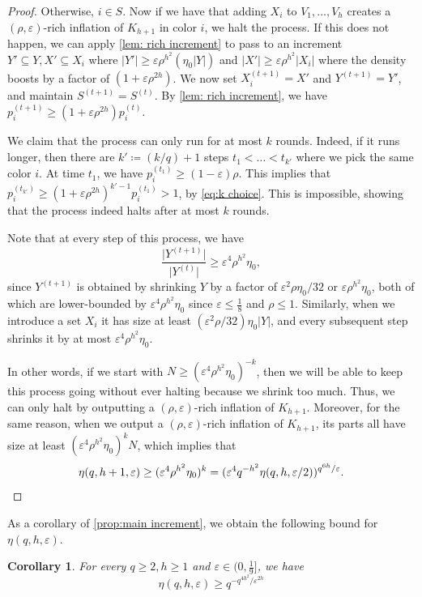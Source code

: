 \documentclass{aic}
\theoremstyle{plain}
\newtheorem{corollary}[theorem]{Corollary}
\theoremstyle{remark}
\newcommand{\eps}{\ensuremath{\varepsilon}}
\newcommand\ab[1]{\lvert #1 \rvert}
\newcommand\up[1]{^{(#1)}}
\begin{document}
\begin{proof}
Otherwise, $i\in S$. Now if we have that adding $X_i$ to $V_1,\dots,V_{h}$ creates a $(\rho,\eps)$-rich inflation of $K_{h+1}$ in color $i$, we halt the process. If this does not happen, we can apply \cref{lem: rich increment} to pass to an increment $Y'\subseteq Y,X'\subseteq X_i$ where $|Y'|\ge \eps \rho^{h^2}(\eta_0 \ab{Y})$ and $|X'|\ge \eps \rho^{h^2}|X_i|$ where the density boosts by a factor of $(1+\eps\rho^{2h})$. We now set $X_i \up{t+1}=X'$ and $Y\up{t+1} = Y'$, and maintain $S\up{t+1}=S\up t$. By \cref{lem: rich increment}, we have $p_i\up{t+1} \geq (1+\eps \rho^{2h})p_i\up t$.

We claim that the process can only run for at most $k$ rounds. Indeed, if it runs longer, then there are $k'\coloneqq (k/q)+1$ steps $t_1<\dots <t_{k'}$ where we pick the same color $i$. At time $t_1$, we have $p_i\up{t_1}\ge (1-\eps)\rho$. This implies that $p_i\up {t_{k'}} \ge (1+\eps\rho^{2h})^{k'-1}p_i\up {t_1}>1$, by \eqref{eq:k choice}. This is impossible, showing that the process indeed halts after at most $k$ rounds.

Note that at every step of this process, we have
\[
\frac{\ab{Y\up{t+1}}}{\ab{Y\up t}} \geq \eps^4 \rho^{h^2} \eta_0,
\]
since $Y\up {t+1}$ is obtained by shrinking $Y$ by a factor of $\eps^2 \rho\eta_0/32$ or $\eps \rho^{h^2}\eta_0$, both of which are lower-bounded by $\eps^4 \rho^{h^2}\eta_0$ since $\eps \leq \frac 18$ and $\rho \leq 1$. Similarly, when we introduce a set $X_i$ it has size at least $(\eps^2 \rho/32)\eta_0 \ab Y$, and every subsequent step shrinks it by at most $\eps^4 \rho^{h^2} \eta_0$.

In other words, if we start with $N \geq (\eps^4 \rho^{h^2}\eta_0)^{-k}$, then we will be able to keep this process going without ever halting because we shrink too much. Thus, we can only halt by outputting a $(\rho,\eps)$-rich inflation of $K_{h+1}$. Moreover, for the same reason, when we output a $(\rho,\eps)$-rich inflation of $K_{h+1}$, its parts all have size at least $(\eps^4 \rho^{h^2}\eta_0)^k N$, which implies that
\[
\eta(q,h+1,\eps) \geq (\eps^4 \rho^{h^2} \eta_0)^k = (\eps^4 q^{-h^2} \eta(q,h,\eps/2))^{q^{6h}/\eps}.\qedhere
\]
\end{proof}
As a corollary of \cref{prop:main increment}, we obtain the following bound for $\eta(q,h,\eps)$.
\begin{corollary}\label{cor:eta LB}
    For every $q\geq 2,h \geq 1$ and $\eps \in (0,\frac 19]$, we have
    \[
    \eta(q,h,\eps) \geq q^{-q^{4h^2}/\eps^{2h}}
    \]
\end{corollary}
\end{document}

